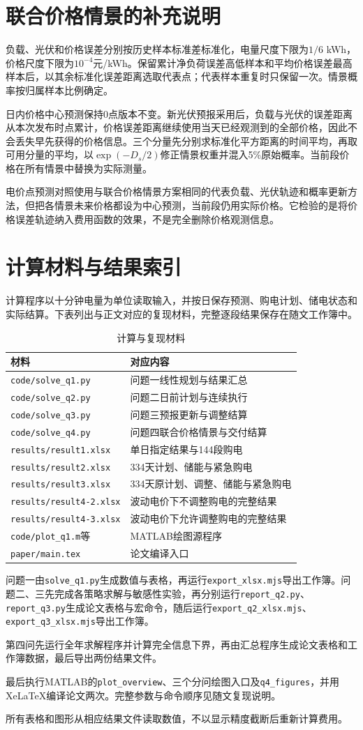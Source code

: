 \section{联合价格情景的补充说明}
负载、光伏和价格误差分别按历史样本标准差标准化，电量尺度下限为$1/6$ kWh，价格尺度下限为$10^{-4}$元/kWh。保留累计净负荷误差高低样本和平均价格误差最高样本后，以其余标准化误差距离选取代表点；代表样本重复时只保留一次。情景概率按归属样本比例确定。

日内价格中心预测保持0点版本不变。新光伏预报采用后，负载与光伏的误差距离从本次发布时点累计，价格误差距离继续使用当天已经观测到的全部价格，因此不会丢失早先获得的价格信息。三个分量先分别求标准化平方距离的时间平均，再取可用分量的平均，以$\exp(-D_s/2)$修正情景权重并混入5\%原始概率。当前段价格在所有情景中替换为实际测量。

电价点预测对照使用与联合价格情景方案相同的代表负载、光伏轨迹和概率更新方法，但把各情景未来价格都设为中心预测，当前段仍用实际价格。它检验的是将价格误差轨迹纳入费用函数的效果，不是完全删除价格观测信息。

\section{计算材料与结果索引}
计算程序以十分钟电量为单位读取输入，并按日保存预测、购电计划、储电状态和实际结算。下表列出与正文对应的复现材料，完整逐段结果保存在随文工作簿中。
\begin{table}[htbp]\centering\small
\caption{计算与复现材料}
\begin{tabular}{ll}\toprule
材料 & 对应内容\\\midrule
\texttt{code/solve\_q1.py} & 问题一线性规划与结果汇总\\
\texttt{code/solve\_q2.py} & 问题二日前计划与连续执行\\
\texttt{code/solve\_q3.py} & 问题三预报更新与调整结算\\
\texttt{code/solve\_q4.py} & 问题四联合价格情景与交付结算\\
\texttt{results/result1.xlsx} & 单日指定结果与144段购电\\
\texttt{results/result2.xlsx} & 334天计划、储能与紧急购电\\
\texttt{results/result3.xlsx} & 334天原计划、调整、储能与紧急购电\\
\texttt{results/result4-2.xlsx} & 波动电价下不调整购电的完整结果\\
\texttt{results/result4-3.xlsx} & 波动电价下允许调整购电的完整结果\\
\texttt{code/plot\_q1.m}等 & MATLAB绘图源程序\\
\texttt{paper/main.tex} & 论文编译入口\\
\bottomrule\end{tabular}
\end{table}
问题一由\texttt{solve\_q1.py}生成数值与表格，再运行\texttt{export\_xlsx.mjs}导出工作簿。问题二、三先完成各策略求解与敏感性实验，再分别运行\texttt{report\_q2.py}、\texttt{report\_q3.py}生成论文表格与宏命令，随后运行\texttt{export\_q2\_xlsx.mjs}、\texttt{export\_q3\_xlsx.mjs}导出工作簿。

第四问先运行全年求解程序并计算完全信息下界，再由汇总程序生成论文表格和工作簿数据，最后导出两份结果文件。

最后执行MATLAB的\texttt{plot\_overview}、三个分问绘图入口及\texttt{q4\_figures}，并用XeLaTeX编译论文两次。完整参数与命令顺序见随文复现说明。

所有表格和图形从相应结果文件读取数值，不以显示精度截断后重新计算费用。
